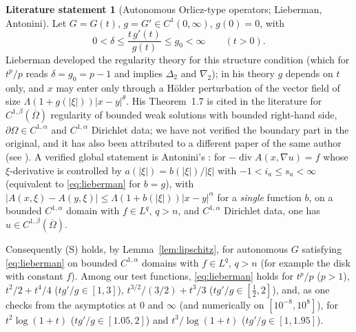 \documentclass[11pt]{amsart}
\theoremstyle{definition}
\newtheorem{fact}[theorem]{Literature statement}
\theoremstyle{remark}
\numberwithin{equation}{section}
\newcommand{\abs}[1]{\lvert #1\rvert}
\DeclareMathOperator{\divg}{div}
\begin{document}
\begin{fact}[Autonomous Orlicz-type operators; Lieberman, Antonini]\label{fact:lieberman}
Let $G=G(t)$, $g=G'\in C^1(0,\infty)$, $g(0)=0$, with
\begin{equation}\label{eq:lieberman}
0<\delta\le\frac{t\,g'(t)}{g(t)}\le g_0<\infty\qquad(t>0).
\end{equation}
Lieberman \cite{Lieberman1991} developed the regularity theory for this structure condition (which for $t^p/p$ reads $\delta=g_0=p-1$ and implies $\Delta_2$ and $\nabla_2$); in his theory $g$ depends on $t$ only, and $x$ may enter only through a H\"older perturbation of the vector field of size $\Lambda(1+g(\abs\xi))\abs{x-y}^\theta$. His Theorem~1.7 is cited in the literature for $C^{1,\beta}(\overline\Omega)$ regularity of bounded weak solutions with bounded right-hand side, $\partial\Omega\in C^{1,\alpha}$ and $C^{1,\alpha}$ Dirichlet data; we have not verified the boundary part in the original, and it has also been attributed to a different paper of the same author (see \cite{Antonini2026}). A verified global statement is Antonini's \cite[Cor.~1.4]{Antonini2026}: for $-\divg A(x,\nabla u)=f$ whose $\xi$-derivative is controlled by $a(\abs\xi)=b(\abs\xi)/\abs\xi$ with $-1<i_a\le s_a<\infty$ (equivalent to \eqref{eq:lieberman} for $b=g$), with $\abs{A(x,\xi)-A(y,\xi)}\le\Lambda(1+b(\abs\xi))\abs{x-y}^\alpha$ for a \emph{single} function $b$, on a bounded $C^{1,\alpha}$ domain with $f\in L^q$, $q>n$, and $C^{1,\alpha}$ Dirichlet data, one has $u\in C^{1,\beta}(\overline\Omega)$.
\end{fact}
Consequently (S) holds, by Lemma~\ref{lem:lipschitz}, for autonomous $G$ satisfying \eqref{eq:lieberman} on bounded $C^{1,\alpha}$ domains with $f\in L^q$, $q>n$ (for example the disk with constant $f$). Among our test functions, \eqref{eq:lieberman} holds for $t^p/p$ ($p>1$), $t^2/2+t^4/4$ ($tg'/g\in[1,3]$), $t^{3/2}/(3/2)+t^3/3$ ($tg'/g\in[\tfrac12,2]$), and, as one checks from the asymptotics at $0$ and $\infty$ (and numerically on $[10^{-8},10^{8}]$), for $t^2\log(1+t)$ ($tg'/g\in[1.05,2]$) and $t^3/\log(1+t)$ ($tg'/g\in[1,1.95]$).
\end{document}
